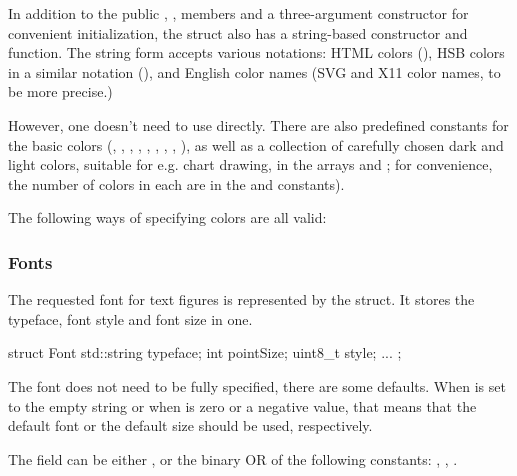 In addition to the public , ,  members
and a three-argument constructor for convenient initialization, the struct
also has a string-based constructor and  function.
The string form accepts various notations: HTML colors (),
HSB colors in a similar notation (), and English color names
(SVG and X11 color names, to be more precise.)

However, one doesn't need to use  directly.
There are also predefined constants for the basic colors (,
, , , , , ,
, ), as well as a collection of carefully chosen
dark and light colors, suitable for e.g. chart drawing, in the arrays
 and ; for convenience,
the number of colors in each are in the 
and  constants).

The following ways of specifying colors are all valid:



\subsubsection{Fonts}
\label{sec:graphics:canvas-fonts}

The requested font for text figures is represented by the 
struct. It stores the typeface, font style and font size in one.

\begin{cpp}
struct Font {
    std::string typeface;
    int pointSize;
    uint8_t style;
    ...
};
\end{cpp}

The font does not need to be fully specified, there are some defaults. When
 is set to the empty string or when  is zero
or a negative value, that means that the default font or the default size
should be used, respectively.

The  field can be either , or the binary OR of
the following constants: , ,
.

